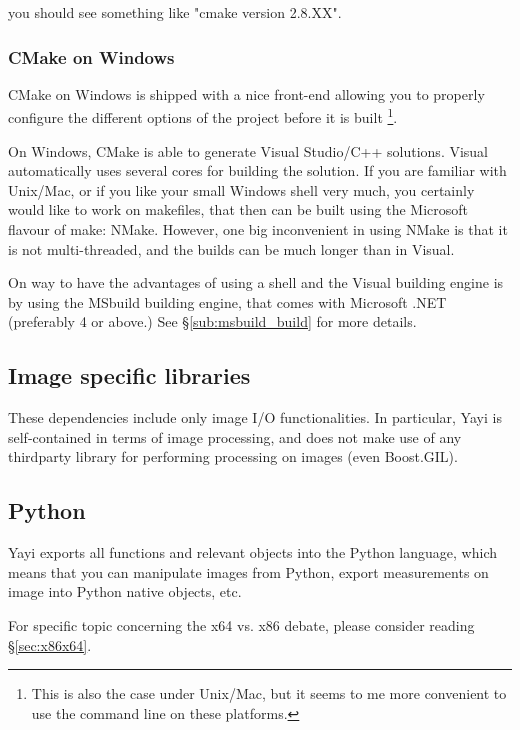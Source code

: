 you should see something like "cmake version 2.8.XX". 

\subsubsection{CMake on Windows}
CMake on Windows is shipped with a nice front-end allowing you to properly configure the different options of the project before it is built \footnote{This is also the case under Unix/Mac, but it seems to me more convenient to use the command line on these platforms.}. 

On Windows, CMake is able to generate Visual Studio/C++ solutions. Visual automatically uses several cores for building the solution. If you are familiar with Unix/Mac, or if you like your small Windows shell very much, you certainly would like to work on makefiles, that then can be built using the Microsoft flavour of make: NMake. However, one big inconvenient in using NMake is that it is not multi-threaded, and the builds can be much longer than in Visual. 

On way to have the advantages of using a shell and the Visual building engine is by using the MSbuild building engine, that comes with Microsoft .NET (preferably 4 or above.) %
See \S \ref{sub:msbuild_build} for more details.

\subsection{Image specific libraries}
These dependencies include only image I/O functionalities. In particular, Yayi is self-contained in terms of image processing, and does not make use of any thirdparty library for performing processing on images (even Boost.GIL). 


\subsection{Python}
Yayi exports all functions and relevant objects into the Python language, which means that you can manipulate images from Python, export measurements on image into Python native objects, etc. 

For specific topic concerning the x64 vs. x86 debate, please consider reading \S \ref{sec:x86x64}. 

